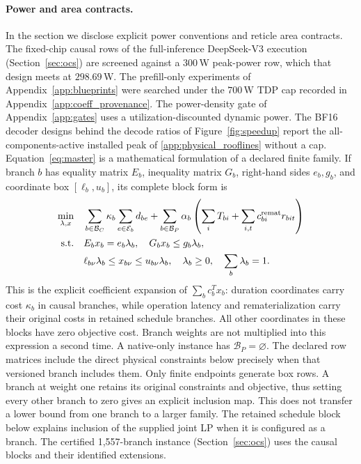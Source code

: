 \paragraph{Power and area contracts.}
In the section we disclose explicit power conventions and reticle area contracts.
The fixed-chip causal rows of the full-inference DeepSeek-V3 execution (Section~\ref{sec:ocs}) are screened against a $300$\,W peak-power row, which that design meets at $298.69$\,W. The prefill-only experiments of Appendix~\ref{app:blueprints} were searched under the $700$\,W TDP cap recorded in Appendix~\ref{app:coeff_provenance}.
The power-density gate of Appendix~\ref{app:gates} uses a utilization-discounted dynamic power.
The BF16 decoder designs behind the decode ratios of Figure~\ref{fig:speedup} report the all-components-active installed peak of \ref{app:physical_rooflines} without a cap.
Equation~\eqref{eq:master} is a mathematical formulation of a declared finite family.
If branch $b$ has equality matrix $E_b$, inequality matrix $G_b$, right-hand sides $e_b,g_b$, and coordinate box $[\ell_b,u_b]$, its complete block form is
\begin{equation}
\begin{aligned}
 \min_{\lambda,x}\quad&
 \sum_{b\in\mathcal B_C}\kappa_b\sum_{e\in\mathcal E_b}d_{be}
 +\sum_{b\in\mathcal B_P}\alpha_b
       \left(\sum_iT_{bi}+\sum_{i,t}c^{\rm remat}_{bi}r_{bit}\right)\\
 \text{s.t.}\quad&E_bx_b=e_b\lambda_b,\quad G_bx_b\le g_b\lambda_b,\\
 &\ell_{b\nu}\lambda_b\le x_{b\nu}\le u_{b\nu}\lambda_b,\quad
   \lambda_b\ge0,\quad\sum_b\lambda_b=1.
\end{aligned}
\label{eq:master_block}
\end{equation}
This is the explicit coefficient expansion of $\sum_b c_b^Tx_b$: duration coordinates carry cost $\kappa_b$ in causal branches, while operation latency and rematerialization carry their original costs in retained schedule branches.
All other coordinates in these blocks have zero objective cost.
Branch weights are not multiplied into this expression a second time.
A native-only instance has $\mathcal B_P=\varnothing$.
The declared row matrices include the direct physical constraints below precisely when that versioned branch includes them.
Only finite endpoints generate box rows.
A branch at weight one retains its original constraints and objective, thus setting every other branch to zero gives an explicit inclusion map.
This does not transfer a lower bound from one branch to a larger family.
The retained schedule block below explains inclusion of the supplied joint LP when it is configured as a branch.
The certified 1,557-branch instance (Section~\ref{sec:ocs}) uses the causal blocks and their identified extensions.

